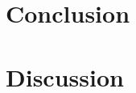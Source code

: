 \documentclass{article}
\begin{document}


\section{Conclusion}



\section{Discussion}




%



\end{document}
